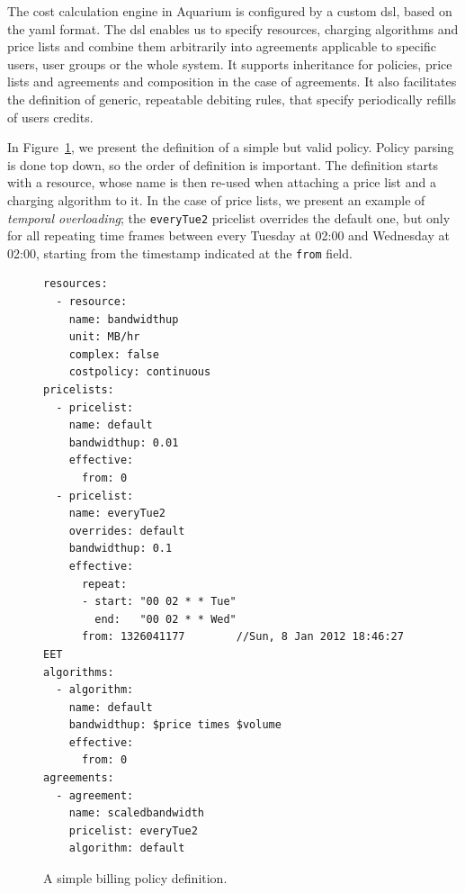 \documentclass[letterpaper,twocolumn,10pt]{article}
\begin{document}
The cost calculation engine in Aquarium is configured by a 
custom {\sc dsl}, based on the {\sc yaml} format. The {\sc dsl} enables
us to specify resources, charging algorithms and
price lists and combine them arbitrarily into agreements applicable to
specific users, user groups or the whole system. It
supports inheritance for policies, price lists and agreements and
composition in the case of agreements. It also facilitates the
definition of generic, repeatable debiting rules, that specify
periodically refills of users credits.

In Figure~\ref{fig:dsl}, we present the definition of a simple but
valid policy. Policy parsing is done top down, so the order of
definition is important. The definition starts with a resource, whose
name is then re-used when attaching a price list and a charging
algorithm to it. In the case of price lists, we present an example of
\emph{temporal overloading}; the \texttt{everyTue2} pricelist
overrides the default one, but only for all repeating time frames
between every Tuesday at 02:00 and Wednesday at 02:00, starting from
the timestamp indicated at the \texttt{from} field.

\begin{figure}
\lstset{language=c, basicstyle=\footnotesize,
stringstyle=\ttfamily, 
flexiblecolumns=true, aboveskip=-0.9em, belowskip=0em, lineskip=0em}

\begin{lstlisting}
resources:
  - resource:
    name: bandwidthup
    unit: MB/hr
    complex: false
    costpolicy: continuous
pricelists:
  - pricelist: 
    name: default
    bandwidthup: 0.01
    effective:
      from: 0
  - pricelist: 
    name: everyTue2
    overrides: default
    bandwidthup: 0.1
    effective:
      repeat:
      - start: "00 02 * * Tue"
        end:   "00 02 * * Wed"
      from: 1326041177        //Sun, 8 Jan 2012 18:46:27 EET
algorithms:
  - algorithm:
    name: default
    bandwidthup: $price times $volume
    effective:
      from: 0
agreements:
  - agreement:
    name: scaledbandwidth
    pricelist: everyTue2
    algorithm: default
\end{lstlisting}
\caption{A simple billing policy definition.} 
\label{fig:dsl}
\end{figure}

\end{document}
